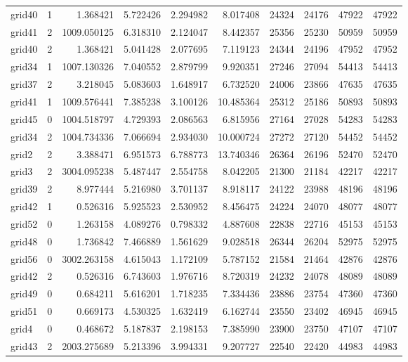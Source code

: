 \begin{longtable}{|l|r|r|r|r|r|r|r|r|r|}
grid40 & 1 & 1.368421 & 5.722426 & 2.294982 & 8.017408 & 24324 & 24176 & 47922 & 47922 \\
grid41 & 2 & 1009.050125 & 6.318310 & 2.124047 & 8.442357 & 25356 & 25230 & 50959 & 50959 \\
grid40 & 2 & 1.368421 & 5.041428 & 2.077695 & 7.119123 & 24344 & 24196 & 47952 & 47952 \\
grid34 & 1 & 1007.130326 & 7.040552 & 2.879799 & 9.920351 & 27246 & 27094 & 54413 & 54413 \\
grid37 & 2 & 3.218045 & 5.083603 & 1.648917 & 6.732520 & 24006 & 23866 & 47635 & 47635 \\
grid41 & 1 & 1009.576441 & 7.385238 & 3.100126 & 10.485364 & 25312 & 25186 & 50893 & 50893 \\
grid45 & 0 & 1004.518797 & 4.729393 & 2.086563 & 6.815956 & 27164 & 27028 & 54283 & 54283 \\
grid34 & 2 & 1004.734336 & 7.066694 & 2.934030 & 10.000724 & 27272 & 27120 & 54452 & 54452 \\
grid2 & 2 & 3.388471 & 6.951573 & 6.788773 & 13.740346 & 26364 & 26196 & 52470 & 52470 \\
grid3 & 2 & 3004.095238 & 5.487447 & 2.554758 & 8.042205 & 21300 & 21184 & 42217 & 42217 \\
grid39 & 2 & 8.977444 & 5.216980 & 3.701137 & 8.918117 & 24122 & 23988 & 48196 & 48196 \\
grid42 & 1 & 0.526316 & 5.925523 & 2.530952 & 8.456475 & 24224 & 24070 & 48077 & 48077 \\
grid52 & 0 & 1.263158 & 4.089276 & 0.798332 & 4.887608 & 22838 & 22716 & 45153 & 45153 \\
grid48 & 0 & 1.736842 & 7.466889 & 1.561629 & 9.028518 & 26344 & 26204 & 52975 & 52975 \\
grid56 & 0 & 3002.263158 & 4.615043 & 1.172109 & 5.787152 & 21584 & 21464 & 42876 & 42876 \\
grid42 & 2 & 0.526316 & 6.743603 & 1.976716 & 8.720319 & 24232 & 24078 & 48089 & 48089 \\
grid49 & 0 & 0.684211 & 5.616201 & 1.718235 & 7.334436 & 23886 & 23754 & 47360 & 47360 \\
grid51 & 0 & 0.669173 & 4.530325 & 1.632419 & 6.162744 & 23550 & 23402 & 46945 & 46945 \\
grid4 & 0 & 0.468672 & 5.187837 & 2.198153 & 7.385990 & 23900 & 23750 & 47107 & 47107 \\
grid43 & 2 & 2003.275689 & 5.213396 & 3.994331 & 9.207727 & 22540 & 22420 & 44983 & 44983 \\

\end{longtable}
